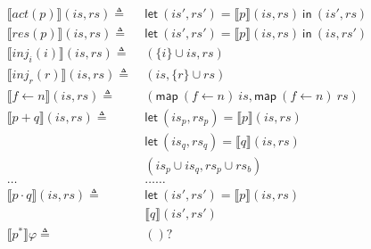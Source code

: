 \documentclass[12pt, letterpaper]{article}
\begin{document}
\begin{align*}
		\llbracket act(p) \rrbracket(\mathit{is}, \mathit{rs})
			\triangleq\ &
			\mathsf{let}\ (\mathit{is}',\mathit{rs}')
                = \llbracket p\rrbracket(\mathit{is}, \mathit{rs})\ 
                \mathsf{in}\ (\mathit{is}',\mathit{rs})
			\\
		\llbracket res(p) \rrbracket(\mathit{is}, \mathit{rs})
			\triangleq\ &
		\mathsf{let}\ (\mathit{is}',\mathit{rs}')
                = \llbracket p\rrbracket(\mathit{is}, \mathit{rs})\ 
                \mathsf{in}\ (\mathit{is},\mathit{rs}')
			\\
		\llbracket inj_{i}(i) \rrbracket(\mathit{is}, \mathit{rs})
			\triangleq\ &
			(\{i\} \cup \mathit{is}, \mathit{rs})
			\\
		\llbracket inj_{r}(r) \rrbracket(\mathit{is}, \mathit{rs})
			\triangleq\ &
			(\mathit{is}, \{r\} \cup \mathit{rs})
			\\
		\llbracket f \leftarrow n \rrbracket(\mathit{is}, \mathit{rs})
			\triangleq\ &
                (\mathsf{map}\ (f\leftarrow n)\ \mathit{is},
                 \mathsf{map}\ (f\leftarrow n)\ \mathit{rs}) \\
		 \llbracket p + q \rrbracket(\mathit{is}, \mathit{rs})
                \triangleq\ &
                 \mathsf{let}\ (\mathit{is}_p,\mathit{rs}_p) =
                 \llbracket p \rrbracket(\mathit{is}, \mathit{rs}) \\
                &\mathsf{let}\ (\mathit{is}_q,\mathit{rs}_q) =
                \llbracket q \rrbracket(\mathit{is}, \mathit{rs}) \\
                &(\mathit{is}_p \cup \mathit{is}_q,\mathit{rs}_p \cup \mathit{rs}_b) \\
		\dots & \dots \dots \\
		\llbracket p \cdot q \rrbracket(\mathit{is}, \mathit{rs})
                \triangleq\ &
                 \mathsf{let}\ (\mathit{is}',\mathit{rs}') =
                 \llbracket p \rrbracket(\mathit{is}, \mathit{rs}) \\
                 &\llbracket q \rrbracket(\mathit{is}', \mathit{rs}') \\
		\llbracket p ^{*} \rrbracket \varphi
			\triangleq\ &
			()?
			\\
	\end{align*}
\end{document}
